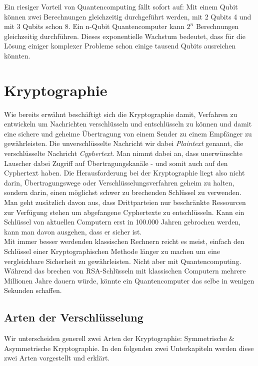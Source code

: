 \documentclass[12pt]{article}
\begin{document}
Ein riesiger Vorteil von Quantencomputing fällt sofort auf: Mit einem Qubit können zwei Berechnungen gleichzeitig durchgeführt werden, mit 2 Qubits 4 und mit 3 Qubits schon 8. Ein n-Qubit Quantencomputer kann \(2^n\) Berechnungen gleichzeitig durchführen. Dieses exponentielle Wachstum bedeutet, dass für die Lösung einiger komplexer Probleme schon einige tausend Qubits ausreichen könnten. \cite{mavroeidis2018impact}

\clearpage
\section{Kryptographie}

Wie bereits erwähnt beschäftigt sich die Kryptographie damit, Verfahren zu entwickeln um Nachrichten verschlüsseln und entschlüsseln zu können und damit eine sichere und geheime Übertragung von einem Sender zu einem Empfänger zu gewährleisten. Die unverschlüsselte Nachricht wir dabei \textit{Plaintext} genannt, die verschlüsselte Nachricht \textit{Cyphertext}. Man nimmt dabei an, dass unerwünschte Lauscher dabei Zugriff auf Übertragungskanäle - und somit auch auf den Cyphertext haben. Die Herausforderung bei der Kryptographie liegt also nicht darin, Übertragungswege oder Verschlüsselungsverfahren geheim zu halten, sondern darin, einen möglichst schwer zu brechenden Schlüssel zu verwenden. \cite{Uhl2022Krypto} \\

Man geht zusätzlich davon aus, dass Drittparteien nur beschränkte Ressourcen zur Verfügung stehen um abgefangene Cyphertexte zu entschlüsseln. Kann ein Schlüssel von aktuellen Computern erst in 100.000 Jahren gebrochen werden, kann man davon ausgehen, dass er sicher ist. \cite{mavroeidis2018impact} \\
Mit immer besser werdenden klassischen Rechnern reicht es meist, einfach den Schlüssel einer Kryptographischen Methode länger zu machen um eine vergleichbare Sicherheit zu gewährleisten. Nicht aber mit Quantencomputing. Während das brechen von RSA-Schlüsseln mit klassischen Computern mehrere Millionen Jahre dauern würde, könnte ein Quantencomputer das selbe in wenigen Sekunden schaffen.

\subsection{Arten der Verschlüsselung}

Wir unterscheiden generell zwei Arten der Kryptographie: Symmetrische \& Asymmetrische Kryptographie. In den folgenden zwei Unterkapiteln werden diese zwei Arten vorgestellt und erklärt.
\end{document}
